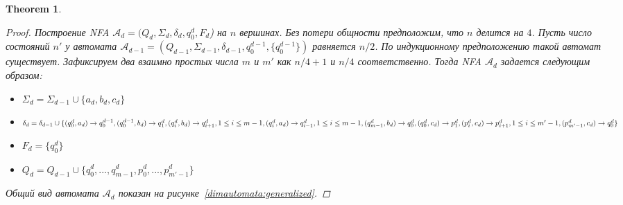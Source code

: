 \documentclass[11pt,a4paper]{article} %
\newtheorem{theorem}{Theorem}
\begin{document}
\begin{theorem}
\begin{proof}
\textit{Построение NFA $\mathcal{A}_{d} = (Q_d,\Sigma_d ,\delta_d ,q^{d}_{0},F_d$)} на $n$ вершинах. Без потери общности предположим, что $n$ делится на $4$.
Пусть число состояний $n'$ у автомата $\mathcal{A}_{d-1}= (Q_{d-1},\Sigma_{d-1} ,\delta_{d-1} ,q^{d-1}_{0},\{q^{d-1}_{0}\})$ равняется $n/2$. По индукционному предположению такой автомат существует. Зафиксируем два взаимно простых числа $m$ и $m'$ как $n/4+1$ и $n/4$ соответственно.
Тогда NFA $\mathcal{A}_{d}$ задается следующим образом:
\begin{itemize}
\item $\Sigma_{d} = \Sigma_{d-1} \cup \{a_d, b_d, c_d\}$
\item $\delta_{d} = \delta_{d-1} \cup \{
\\(q^{d}_{0}, a_d) \rightarrow q^{d-1}_{0},
\\(q^{d-1}_{0}, b_d) \rightarrow q^{d}_{1},
\\(q^{d}_{i}, b_d) \rightarrow q^{d}_{i+1}, 1 \le i \le m-1,
\\(q^{d}_{i}, a_d) \rightarrow q^{d}_{i-1}, 1 \le i \le m-1,
\\(q^{d}_{m-1}, b_d) \rightarrow q^{d}_{0},
\\(q^{d}_{0}, c_d) \rightarrow p^{d}_{1},
\\(p^{d}_{i}, c_d) \rightarrow p^{d}_{i+1}, 1 \le i \le m'-1,
\\(p^{d}_{m'-1}, c_d) \rightarrow q^{d}_{0}\}$
\item $F_d = \{q^{d}_{0}\}$
\item $Q_d = Q_{d-1} \cup \{ q^d_{0}, ..., q^d_{m-1}, p^d_{0}, ..., p^d_{m'-1}\}$
\end{itemize}
Общий вид автомата $\mathcal{A}_{d}$ показан на рисунке~\ref{dimautomata:generalized}.



\end{proof}
\end{theorem}
\end{document}
